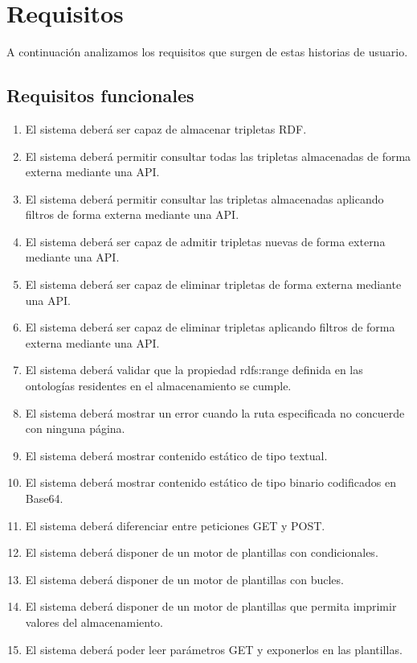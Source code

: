 \documentclass[12pt]{report} %
\begin{document}
\section{Requisitos}

A continuación analizamos los requisitos que surgen de estas historias de usuario.

\subsection{Requisitos funcionales}
\begin{enumerate}
    \item El sistema deberá ser capaz de almacenar tripletas RDF.
    \item El sistema deberá permitir consultar todas las tripletas almacenadas de forma externa mediante una API.
    \item El sistema deberá permitir consultar las tripletas almacenadas aplicando filtros de forma externa mediante una API.
    \item El sistema deberá ser capaz de admitir tripletas nuevas de forma externa mediante una API.
    \item El sistema deberá ser capaz de eliminar tripletas de forma externa mediante una API.
    \item El sistema deberá ser capaz de eliminar tripletas aplicando filtros de forma externa mediante una API.
    \item El sistema deberá validar que la propiedad rdfs:range definida en las ontologías residentes en el almacenamiento se cumple.
    \item El sistema deberá mostrar un error cuando la ruta especificada no concuerde con ninguna página.
    \item El sistema deberá mostrar contenido estático de tipo textual.
    \item El sistema deberá mostrar contenido estático de tipo binario codificados en Base64.
    \item El sistema deberá diferenciar entre peticiones GET y POST.
    \item El sistema deberá disponer de un motor de plantillas con condicionales.
    \item El sistema deberá disponer de un motor de plantillas con bucles.
    \item El sistema deberá disponer de un motor de plantillas que permita imprimir valores del almacenamiento.
    \item El sistema deberá poder leer parámetros GET y exponerlos en las plantillas.

\end{enumerate}
\end{document}
